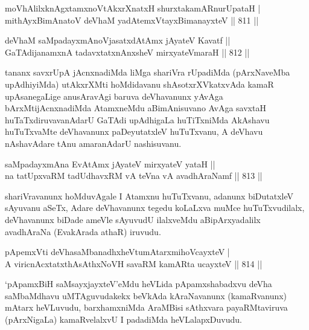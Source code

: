 \begin{shl}
moVhAlilxknAgxtamxnoVtAkxrXnatxH shurxtakamARnurUpataH | \\
mithAyxBimAnatoV deVhaM yadA\s \s temxVtayxBimanayxteV \hfill||  811 ||  
\end{shl}
				
\begin{shl}
deVhaM saMpadayxmAnoV\s jasatxdA\s \s tAmx jAyateV Kavatf ||  \\
GaTAdijanamxnA tadavxtatxnAnxsheV mirxyateV\s maraH \hfill||  812 ||  
\end{shl}

\begin{artha}
tananx savxrUpA jAcnxnadiMda liMga shariVra rUpadiMda (pArxNaveMba upAdhiyiMda) utAkxrXMti hoMdidavanu shAsotxrXVkatxvAda kamaR upAsanegaLige anusAravAgi baruva deVhavanunx yAvAga bArxMtijAcnxnadiMda AtamxneMdu aBimAnisuvano AvAga savxtaH huTaTxdiruvavanAdarU GaTAdi upAdhigaLa huTiTxniMda AkAshavu huTuTxvaMte deVhavanunx paDeyutatxleV huTuTxvanu, A deVhavu nAshavAdare tAnu amaranAdarU nashisuvanu.
\end{artha}

\begin{shl}
saMpadayxmAna EvA\s \s tAmx jAyateV mirxyateV yataH ||  \\
na tatUpxvaRM tadUdhavxRM vA teVna vA avadhAraNamf \hfill||  813 ||  
\end{shl}

\begin{artha}
shariVravanunx hoMduvAgale I Atamxnu huTuTxvanu, adanunx biDutatxleV sAyuvanu aSeTx, Adare deVhavanunx tegedu koLaLxva muMce huTuTxvudilalx, deVhavanunx biDade ameVle sAyuvudU ilalxveMdu aBipArxyadalilx avadhAraNa (EvakArada athaR) iruvudu.
\end{artha}


\begin{shl}
pApemxVti deVhasaMbanadhxheVtumAtarxmihoVcayxteV | \\
A viricnAcxtatxthA\s \s  sAthxNoVH savaRM kamARta ucayxteV \hfill||  814 ||  
\end{shl}

\begin{artha}
`pApamxBiH saMsayxjayxteV'eMdu heVLida pApamxshabadxvu deVha saMbaMdhavu uMTAguvudakekx beVkAda kAraNavanunx (kamaRvanunx) mAtarx heVLuvudu, barxhamxniMda AraMBisi sAthxvara payaRMtaviruva (pArxNigaLa) kamaRvelalxvU I padadiMda heVLalapxDuvudu.
\end{artha}

